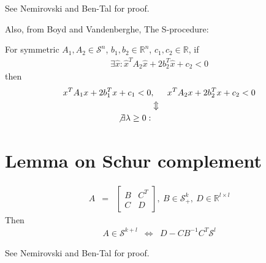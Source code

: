 \documentclass{article}
\begin{document}
See Nemirovski and Ben-Tal for proof.

Also, from Boyd and Vandenberghe, The S-procedure:

For symmetric $A_1,A_2\in\mathcal{S}^n$, $b_1,b_2\in\mathbb{R}^n$, $c_1,c_2\in\mathbb{R}$, if
\begin{eqnarray}
    \exists \hat{x}: \hat{x}^TA_2\hat{x} + 2b_2^T\hat{x} + c_2 < 0
\end{eqnarray}
then 
\begin{eqnarray}
    x^T A_1x + 2b_1^Tx + c_1 < 0 &,&  x^T A_2x + 2b_2^Tx + c_2 < 0 \\
    &\Updownarrow& \\
    \not\exists \lambda\geq 0:
\end{eqnarray}




\section{Lemma on Schur complement}
\begin{eqnarray}
    A & = & \left[\begin{array}{cc} B & C^T \\ C & D\end{array}\right],\ B\in\mathcal{S}^k_+,\ D\in\mathbb{R}^{l\times l}
\end{eqnarray}
Then 
\begin{eqnarray}
    A\in\mathcal{S}^{k+l} & \Leftrightarrow & D-CB^{-1}C^T \mathcal{S}^{l}
\end{eqnarray}

See Nemirovski and Ben-Tal for proof.
\end{document}
